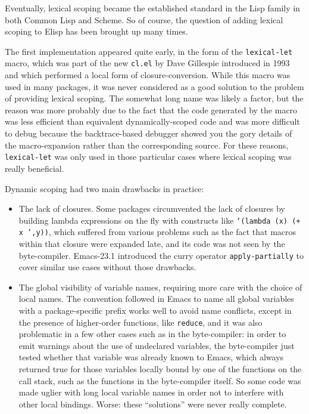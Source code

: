 \documentclass[format=acmsmall, review=false, screen=true]{acmart}
\newcommand \Elisp {Elisp}
\begin{document}
Eventually, lexical scoping became the established standard in
the Lisp family in both Common Lisp and Scheme.
So of course, the question of adding lexical scoping to \Elisp{} has been
brought up many times.

The first implementation appeared quite early, in the form of the
\texttt{lexical-let} macro, which was part of the new \texttt{cl.el} by Dave
Gillespie  introduced in 1993 and which
performed a local form of closure-conversion.
While this macro was used in many packages, it was never considered as
a good solution to the problem of providing lexical scoping.
The somewhat long name was likely a factor, but the reason was more probably
due to the fact that the code generated by the macro was less efficient than
equivalent dynamically-scoped code and was more difficult to debug because
the backtrace-based debugger showed you the gory details of the
macro-expansion rather than the corresponding source.  For these reasons,
\texttt{lexical-let} was only used in those particular cases where lexical
scoping was really beneficial.

Dynamic scoping had two main drawbacks in practice:
\begin{itemize}
\item The lack of closures.  Some packages circumvented the lack of closures
  by building lambda expressions on the fly with constructs like
  \texttt{`(lambda (x) (+ x ',y))}, which suffered from various problems
  such as the fact that macros within that closure were expanded late, and
  its code was not seen by the byte-compiler.  Emacs-23.1 introduced the
  curry operator \texttt{apply-partially} to cover similar use cases without
  those drawbacks.
\item The global visibility of variable names, requiring more care with the
  choice of local names.  The convention followed in Emacs to name all
  global variables with a package-specific prefix works well to avoid name
  conflicts, except in the presence of higher-order functions, like
  \texttt{reduce}, and it was also problematic in a few other cases such as
  in the byte-compiler: in order to emit warnings about the use of
  undeclared variables, the byte-compiler just tested whether that variable
  was already known to Emacs, which always returned true for those variables
  locally bound by one of the functions on the call stack, such as the
  functions in the byte-compiler itself.  So some code was made uglier with
  long local variable names in order not to interfere with other local
  bindings.  Worse: these ``solutions'' were never really complete.
\end{itemize}
\end{document}

